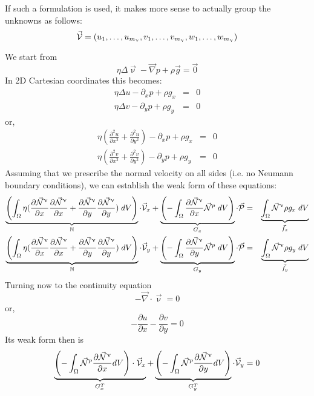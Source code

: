 If such a formulation is used, it makes more sense to actually group the unknowns as follows:
\[
\vec{\cal V}=(u_1, \dots, u_{m_\upnu},v_1,\dots,v_{m_\upnu}, w_1, \dots, w_{m_\upnu})
\]

We start from 
\[
\eta \Delta \vec\upnu -\vec\nabla p + \rho \vec{g} = \vec{0}
\]
In 2D Cartesian coordinates this becomes:
\begin{eqnarray}
\eta \Delta u - \partial_x p + \rho g_x &=& 0\\
\eta \Delta v - \partial_y p + \rho g_y &=& 0
\end{eqnarray}
or, 
\begin{eqnarray}
\eta \left(\frac{\partial^2 u}{\partial x^2} + \frac{\partial^2 u}{\partial y^2} \right) - \partial_x p + \rho g_x &=& 0\\
\eta \left(\frac{\partial^2 v}{\partial x^2} + \frac{\partial^2 v}{\partial y^2} \right) - \partial_y p + \rho g_y &=& 0
\end{eqnarray}
Assuming that we prescribe the normal velocity on all sides (i.e. no Neumann boundary conditions), we can establish the weak form of these equations:
\begin{eqnarray}
\underbrace{
\left(
\int_\Omega \eta (
\frac{\partial \vec{{\mathcal{N}}}^\upnu}{\partial x}
\frac{\partial \vec{{\mathcal{N}}}^\upnu}{\partial x} 
+
\frac{\partial \vec{{\mathcal{N}}}^\upnu}{\partial y}
\frac{\partial \vec{{\mathcal{N}}}^\upnu}{\partial y}) \;
dV \right) }_{{\mathbb{N}}}
\cdot \vec{\cal V}_x
+
\underbrace{
\left(
-\int_\Omega \frac{\partial \vec{{\mathcal{N}}}^\upnu}{\partial x} \vec{{\mathcal{N}}}^p \; dV
\right)}_{G_{x}}
\cdot \vec{\cal P} 
&=& \underbrace{ \int_\Omega \vec{{\mathcal{N}}}^\upnu \rho g_x \; dV }_{\vec{f}_x}\\
\underbrace{
\left(
\int_\Omega \eta (
\frac{\partial \vec{{\mathcal{N}}}^\upnu}{\partial x}
\frac{\partial \vec{{\mathcal{N}}}^\upnu}{\partial x} 
+
\frac{\partial \vec{{\mathcal{N}}}^\upnu}{\partial y}
\frac{\partial \vec{{\mathcal{N}}}^\upnu}{\partial y}) \;
dV \right) }_{{\mathbb{N}}}
\cdot \vec{\cal V}_y
+
\underbrace{
\left(
-\int_\Omega \frac{\partial \vec{{\mathcal{N}}}^\upnu}{\partial y} \vec{{\mathcal{N}}}^p \; dV
\right)}_{G_{y}}
\cdot \vec{\cal P} 
&=& \underbrace{ \int_\Omega \vec{{\mathcal{N}}}^\upnu \rho g_y \; dV }_{\vec{f}_y}
\end{eqnarray}
Turning now to the continuity equation
\[
-\vec\nabla\cdot\vec\upnu = 0
\]
or,
\[
-\frac{\partial u}{\partial x} 
-\frac{\partial v}{\partial y} =0
\]
Its weak form then is
\[
\underbrace{
\left(-\int_\Omega \vec{{\mathcal{N}}}^p \frac{\partial \vec{{\mathcal{N}}}^\upnu}{\partial x} dV
\right) \cdot \vec{\cal V}_x }_{G_x^T}
+
\underbrace{\left(- \int_\Omega \vec{{\mathcal{N}}}^p \frac{\partial \vec{{\mathcal{N}}}^\upnu}{\partial y}   dV \right)}_{G_y^T} \cdot \vec{\cal V}_y 
=0
\]
